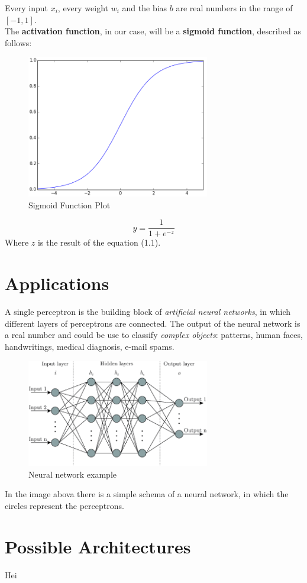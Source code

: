 Every input $x_{i}$, every weight $w_{i}$ and the bias $b$ are real numbers in the range of $[-1, 1]$. \\
The \textbf{activation function}, in our case, will be a \textbf{sigmoid function}, described as follows:
\begin{figure}[h]
	\centering
	\caption{Sigmoid Function Plot}
	\includegraphics[width=8cm]{img/sigmoid.png}
\end{figure}
\begin{equation}
	y = \dfrac{1}{1+e^{-z}}
\end{equation}
Where $z$ is the result of the equation (1.1).
\section{Applications}
A single perceptron is the building block of \textit{artificial neural networks}, in which different layers of perceptrons are connected. The output of the neural network is a real number and could be use to classify \textit{complex objects}: patterns, human faces, handwritings, medical diagnosis, e-mail spams.\\
\begin{figure}[H]
	\centering
	\caption{Neural network example}
	\includegraphics[width=8cm]{img/neural_network.png}
\end{figure}
In the image abova there is a simple schema of a neural network, in which the circles represent the perceptrons.\\
\section{Possible Architectures}

Hei
